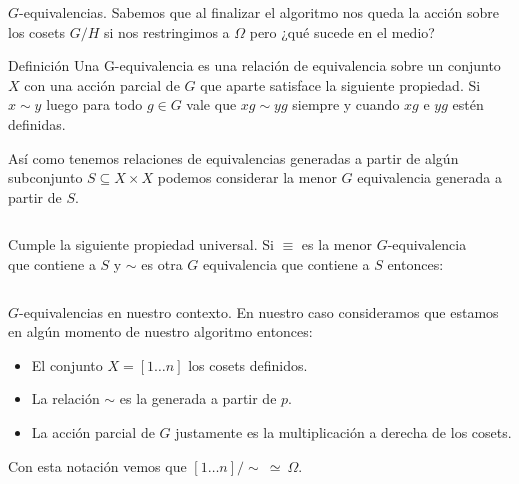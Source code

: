 \documentclass[aspectratio=169, 9pt]{beamer}
\newcommand{\In}{[1 \dots n]}
\newcommand{\ol}{\overline}
\begin{document}
\begin{frame}[fragile]{$G$-equivalencias.}
	Sabemos que al finalizar el algoritmo nos queda la acción sobre los cosets $G/H$ si nos restringimos a $\Omega$ pero ¿qué sucede en el medio?
	\pause
	
	
	\begin{alertblock}{Definición}
		Una \alert{G-equivalencia} es una relación de equivalencia sobre un conjunto $X$ con una acción parcial de $G$ que aparte satisface la siguiente propiedad.
		Si $x \sim y$ luego para todo $g \in G$  vale que $xg \sim yg$ siempre y cuando $xg$ e $yg$ estén definidas.
	\end{alertblock}
	\pause
	
	
	
	Así como tenemos relaciones de equivalencias generadas a partir de algún subconjunto $S \subseteq X \times X$ podemos considerar la menor $G$ equivalencia generada a partir de $S$.
	
	
	
	\pause
	\begin{columns}
		\begin{column}{0.6\textwidth}
			Cumple la siguiente propiedad universal.
			Si $\equiv$ es la menor $G$-equivalencia que contiene a $S$ y $\sim$ es otra $G$ equivalencia que contiene a $S$ entonces:
		\end{column}
		\pause
		\begin{column}{0.4\textwidth}
			\begin{center}
				{\large {}}
			\end{center}
		\end{column}
	\end{columns}
\end{frame}

\begin{frame}[fragile]{$G$-equivalencias en nuestro contexto.}
	En nuestro caso consideramos que estamos en algún momento de nuestro algoritmo entonces:
	\pause
	\begin{itemize}
		\item El conjunto $X = \In$ los cosets definidos.
		\pause
		\item La relación $\sim$ es la generada a partir de $p$.
		\pause
		\item La acción parcial de $G$ justamente es la multiplicación a derecha de los cosets.
	\end{itemize}

\pause

Con esta notación vemos que $\In /\sim \ \simeq \ \Omega$.
\end{frame}
\end{document}
